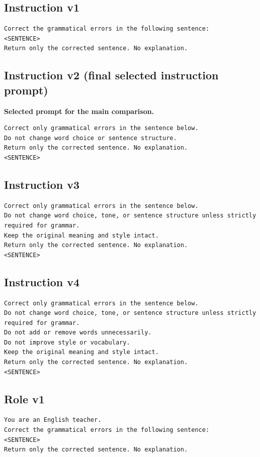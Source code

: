 \subsection{Instruction v1}
\begin{verbatim}
Correct the grammatical errors in the following sentence:
<SENTENCE>
Return only the corrected sentence. No explanation.
\end{verbatim}

\subsection{Instruction v2 (final selected instruction prompt)}
\textbf{Selected prompt for the main comparison.}

\begin{verbatim}
Correct only grammatical errors in the sentence below.
Do not change word choice or sentence structure.
Return only the corrected sentence. No explanation.
<SENTENCE>
\end{verbatim}

\subsection{Instruction v3}
\begin{verbatim}
Correct only grammatical errors in the sentence below.
Do not change word choice, tone, or sentence structure unless strictly required for grammar.
Keep the original meaning and style intact.
Return only the corrected sentence. No explanation.
<SENTENCE>
\end{verbatim}

\subsection{Instruction v4}
\begin{verbatim}
Correct only grammatical errors in the sentence below.
Do not change word choice, tone, or sentence structure unless strictly required for grammar.
Do not add or remove words unnecessarily.
Do not improve style or vocabulary.
Keep the original meaning and style intact.
Return only the corrected sentence. No explanation.
<SENTENCE>
\end{verbatim}

\subsection{Role v1}
\begin{verbatim}
You are an English teacher.
Correct the grammatical errors in the following sentence:
<SENTENCE>
Return only the corrected sentence. No explanation.
\end{verbatim}


